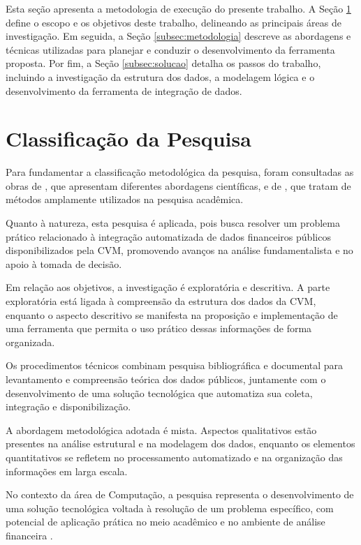 Esta seção apresenta a metodologia de execução do presente trabalho.
A Seção \ref{subsec:classificacao} define o escopo e os objetivos deste trabalho, delineando as principais áreas de investigação.
Em seguida, a Seção \ref{subsec:metodologia} descreve as abordagens e técnicas utilizadas para planejar e conduzir o desenvolvimento da ferramenta proposta.
Por fim, a Seção \ref{subsec:solucao} detalha os passos do trabalho, incluindo a investigação da estrutura dos dados, a modelagem lógica e o desenvolvimento da ferramenta de integração de dados.

\section{Classificação da Pesquisa} \label{subsec:classificacao}

Para fundamentar a classificação metodológica da pesquisa, foram consultadas as obras de \citet{cervo:1983:metodologia}, que apresentam diferentes abordagens científicas, e de \citet{gerhardt:2009:metodos}, que tratam de métodos amplamente utilizados na pesquisa acadêmica.

Quanto à natureza, esta pesquisa é aplicada, pois busca resolver um problema prático relacionado à integração automatizada de dados financeiros públicos disponibilizados pela CVM, promovendo avanços na análise fundamentalista e no apoio à tomada de decisão.

Em relação aos objetivos, a investigação é exploratória e descritiva. A parte exploratória está ligada à compreensão da estrutura dos dados da CVM, enquanto o aspecto descritivo se manifesta na proposição e implementação de uma ferramenta que permita o uso prático dessas informações de forma organizada.

Os procedimentos técnicos combinam pesquisa bibliográfica e documental para levantamento e compreensão teórica dos dados públicos, juntamente com o desenvolvimento de uma solução tecnológica que automatiza sua coleta, integração e disponibilização.

A abordagem metodológica adotada é mista. Aspectos qualitativos estão presentes na análise estrutural e na modelagem dos dados, enquanto os elementos quantitativos se refletem no processamento automatizado e na organização das informações em larga escala.

No contexto da área de Computação, a pesquisa representa o desenvolvimento de uma solução tecnológica voltada à resolução de um problema específico, com potencial de aplicação prática no meio acadêmico e no ambiente de análise financeira \cite{wazlawick:2009:metodo}.


